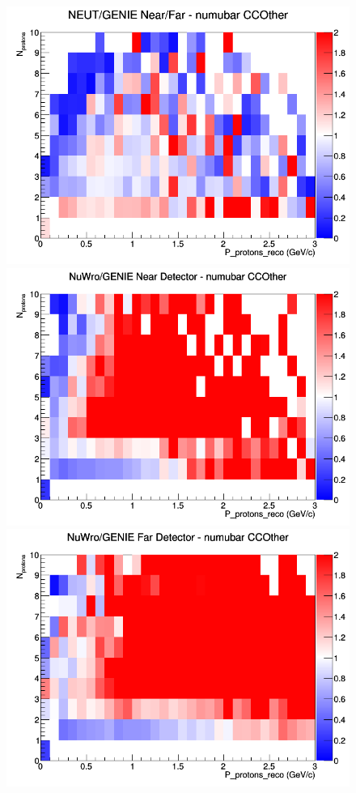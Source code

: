 \begin{figure}[h]
\endminipage
{}
\includegraphics[width=\linewidth]{eff_N_P/GAr/protons/ratios/CCOther_NEUT_GENIE_numubar_NF_N_P.png}
\endminipage
\newline
{}
\includegraphics[width=\linewidth]{eff_N_P/GAr/protons/ratios/CCOther_NuWro_GENIE_numubar_near_N_P.png}
\endminipage
{}
\includegraphics[width=\linewidth]{eff_N_P/GAr/protons/ratios/CCOther_NuWro_GENIE_numubar_far_N_P.png}

\end{figure}
